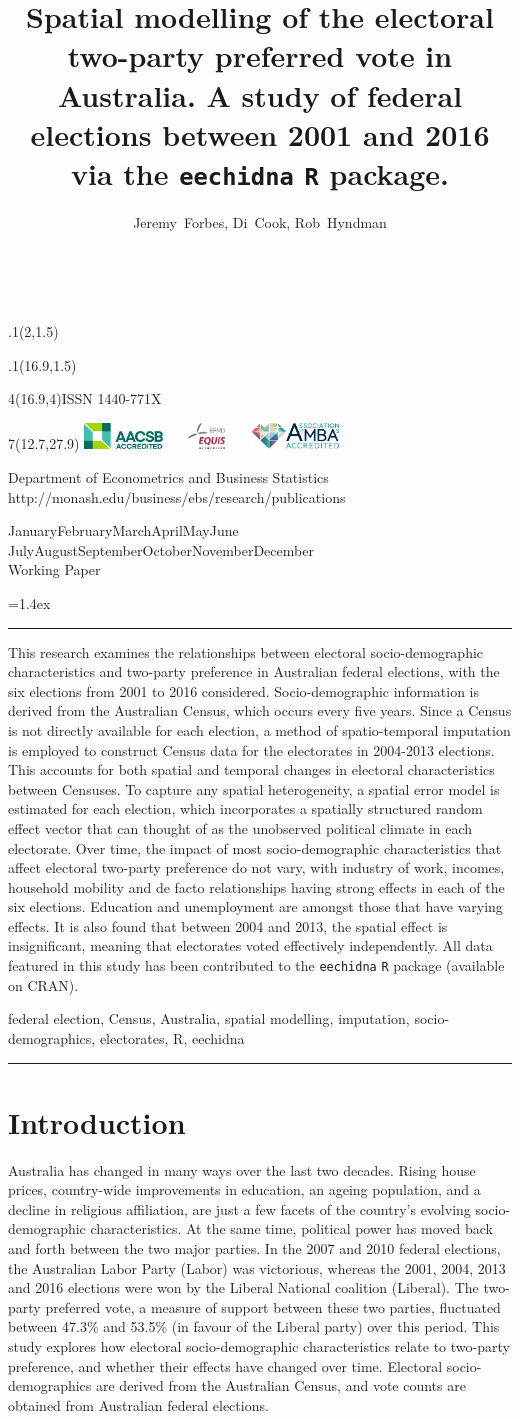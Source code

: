 \documentclass[11pt,a4paper,]{article}
\title{Spatial modelling of the electoral two-party preferred vote in Australia. A study of federal elections between 2001 and 2016 via the \texttt{eechidna} \texttt{R} package.}
\author{Jeremy~Forbes, Di~Cook, Rob~Hyndman}
\date{\sf\Date~\Month~\Year}
\makeatletter
\def\Date{\number\day}
\def\Month{\ifcase\month\or
 January\or February\or March\or April\or May\or June\or
 July\or August\or September\or October\or November\or December\fi}
\def\Year{\number\year}
\def\showjel{{\large\textsf{\textbf{JEL classification:}}~\@jel}}
\def\cover{{\sffamily\setcounter{page}{0}
        \thispagestyle{empty}
        \placefig{2}{1.5}{width=5cm}{monash2}
        \placefig{16.9}{1.5}{width=2.1cm}{MBusSchool}
        \begin{textblock}{4}(16.9,4)ISSN 1440-771X\end{textblock}
        \begin{textblock}{7}(12.7,27.9)\hfill
        \includegraphics[height=0.7cm]{AACSB}~~~
        \includegraphics[height=0.7cm]{EQUIS}~~~
        \includegraphics[height=0.7cm]{AMBA}
        \end{textblock}
        \vspace*{2cm}
        \begin{center}\Large
        Department of Econometrics and Business Statistics\\[.5cm]
        \footnotesize http://monash.edu/business/ebs/research/publications
        \end{center}\vspace{2cm}
        \begin{center}
        \fbox{\parbox{14cm}{\begin{onehalfspace}\centering\Huge\vspace*{0.3cm}
                \textsf{\textbf{\expandafter{\@title}}}\vspace{1cm}\par
                \LARGE\@author\end{onehalfspace}
        }}
        \end{center}
        \vfill
                \begin{center}\Large
                \Month~\Year\\[1cm]
                Working Paper \@wp
        \end{center}\vspace*{2cm}}}
\def\pageone{{\sffamily\setstretch{1}%
        \thispagestyle{empty}%
        \vbox to \textheight{%
        \raggedright\baselineskip=1.2cm
     {\fontsize{24.88}{30}\sffamily\textbf{\expandafter{\@title}}}
        \vspace{2cm}\par
        \hspace{1cm}\parbox{14cm}{\sffamily\large\@addresses}\vspace{1cm}\vfill
        \hspace{1cm}{\large\Date~\Month~\Year}\\[1cm]
        \hspace{1cm}\showjel\vss}}}
\def\blindtitle{{\sffamily
     \thispagestyle{plain}\raggedright\baselineskip=1.2cm
     {\fontsize{24.88}{30}\sffamily\textbf{\expandafter{\@title}}}\vspace{1cm}\par
        }}
\def\titlepage{{\cover\newpage\pageone\newpage\blindtitle}}
\let\maketitle\titlepage
\newenvironment{keywords}{\par\vspace{0.5cm}\noindent{\sffamily\textbf{Keywords:}}}{\vspace{0.25cm}\par\hrule\vspace{0.5cm}\par}
\renewenvironment{abstract}{\begin{minipage}{\textwidth}\parskip=1.4ex\noindent
\hrule\vspace{0.1cm}\par{\sffamily\textbf{\abstractname}}\newline}
  {\end{minipage}}
\def\placefig#1#2#3#4{\begin{textblock}{.1}(#1,#2)\rlap{\texttt{[image: \#4]}}\end{textblock}}
\makeatother
\begin{document}
\maketitle
\begin{abstract}
This research examines the relationships between electoral socio-demographic characteristics and two-party preference in Australian federal elections, with the six elections from 2001 to 2016 considered. Socio-demographic information is derived from the Australian Census, which occurs every five years. Since a Census is not directly available for each election, a method of spatio-temporal imputation is employed to construct Census data for the electorates in 2004-2013 elections. This accounts for both spatial and temporal changes in electoral characteristics between Censuses. To capture any spatial heterogeneity, a spatial error model is estimated for each election, which incorporates a spatially structured random effect vector that can thought of as the unobserved political climate in each electorate. Over time, the impact of most socio-demographic characteristics that affect electoral two-party preference do not vary, with industry of work, incomes, household mobility and de facto relationships having strong effects in each of the six elections. Education and unemployment are amongst those that have varying effects. It is also found that between 2004 and 2013, the spatial effect is insignificant, meaning that electorates voted effectively independently. All data featured in this study has been contributed to the \texttt{eechidna} \texttt{R} package (available on CRAN).
\end{abstract}
\begin{keywords}
federal election, Census, Australia, spatial modelling, imputation, socio-demographics, electorates, R, eechidna
\end{keywords}

\hypertarget{intro}{%
\section{Introduction}\label{intro}}

Australia has changed in many ways over the last two decades. Rising house prices, country-wide improvements in education, an ageing population, and a decline in religious affiliation, are just a few facets of the country's evolving socio-demographic characteristics. At the same time, political power has moved back and forth between the two major parties. In the 2007 and 2010 federal elections, the Australian Labor Party (Labor) was victorious, whereas the 2001, 2004, 2013 and 2016 elections were won by the Liberal National coalition (Liberal). The two-party preferred vote, a measure of support between these two parties, fluctuated between 47.3\% and 53.5\% (in favour of the Liberal party) over this period. This study explores how electoral socio-demographic characteristics relate to two-party preference, and whether their effects have changed over time. Electoral socio-demographics are derived from the Australian Census, and vote counts are obtained from Australian federal elections.
\end{document}
